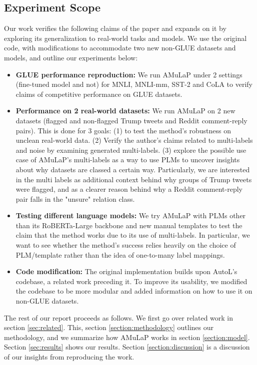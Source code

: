 \subsection{Experiment Scope}
Our work verifies the following claims of the paper and expands on it by exploring its generalization to real-world tasks and models. We use the original code, with modifications to accommodate two new non-GLUE datasets and models, and outline our experiments below: 
\begin{itemize}
     \item \textbf{GLUE performance reproduction: } We run AMuLaP under 2 settings (fine-tuned model and not) for MNLI, MNLI-mm, SST-2 and CoLA to verify claims of competitive performance on GLUE datasets. 
     \label{claim:1}
     \item \textbf{Performance on 2 real-world datasets: } We run AMuLaP on 2 new datasets (flagged and non-flagged Trump tweets and Reddit comment-reply pairs). This is done for 3 goals: (1) to test the method's robustness on unclean real-world data. (2) Verify the author's claims related to multi-labels and noise by examining generated multi-labels. (3) explore the possible use case of AMuLaP's multi-labels as a way to use PLMs to uncover insights about why datasets are classed a certain way. Particularly, we are interested in the multi labels as additional context behind why groups of Trump tweets were flagged, and as a clearer reason behind why a Reddit comment-reply pair falls in the "unsure" relation class. 
     \label{claim:2}
     \item \textbf{Testing different language models: } We try AMuLaP with PLMs other than its RoBERTa-Large backbone and new manual templates to test the claim that the method works due to its use of multi-labels. In particular, we want to see whether the method's success relies heavily on the choice of PLM/template rather than the idea of one-to-many label mappings.
     \label{claim:3}
     \item \textbf{Code modification: } The original implementation builds upon AutoL's \citet{gao-etal-2021-making} codebase, a related work preceding it. To improve its usability, we modified the codebase to be more modular and added information on how to use it on non-GLUE datasets. 
     \label{claim:4}
 \end{itemize}

 The rest of our report proceeds as follows. We first go over related work in section \ref{sec:related}. This, section \ref{section:methodology} outlines our methodology, and we summarize how AMuLaP works in section \ref{section:model}. Section \ref{sec:results} shows our results. Section \ref{section:discussion} is a discussion of our insights from reproducing the work.

